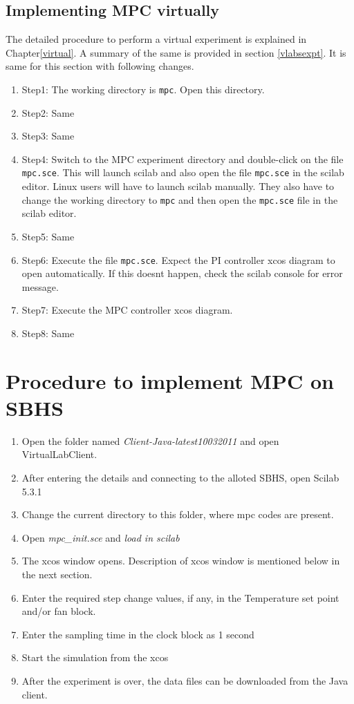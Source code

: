 \subsection{Implementing MPC virtually}

The detailed procedure to perform a virtual experiment is explained in Chapter\ref{virtual}. A summary of the same is provided in section \ref{vlabsexpt}. It is same for this section with following changes.

\begin{enumerate}
\item Step1: The working directory is {\tt  mpc}. Open this directory.
\item Step2: Same
\item Step3: Same
\item Step4:  Switch to the MPC experiment directory and double-click on the file {\tt mpc.sce}. This will launch scilab and also open the file {\tt mpc.sce} in the scilab editor. Linux users will have to launch scilab manually. They also have to change the working directory to {\tt mpc} and then open the {\tt  mpc.sce} file in the scilab editor.
\item Step5: Same
\item Step6: Execute the file {\tt mpc.sce}.  Expect the PI controller xcos diagram to open automatically. If this doesnt happen, check the scilab console for error message.
\item Step7: Execute the MPC controller xcos diagram.
\item Step8: Same
\end{enumerate}
\section{Procedure to implement MPC on SBHS}
\begin{enumerate}
\item Open the folder named \emph{Client-Java-latest10032011} and open VirtualLabClient.
\item After entering the details and connecting to the alloted SBHS, open Scilab 5.3.1
\item Change the current directory to this folder, where mpc codes are present.
\item Open \emph{mpc\_init.sce} and \emph{load in scilab}
\item The xcos window opens. Description of xcos window is mentioned below in the next section.
\item Enter the required step change values, if any, in the Temperature set point and/or fan block.
\item Enter the sampling time in the clock block as 1 second
\item Start the simulation from the xcos
\item After the experiment is over, the data files can be downloaded from the Java client.
\end{enumerate}

